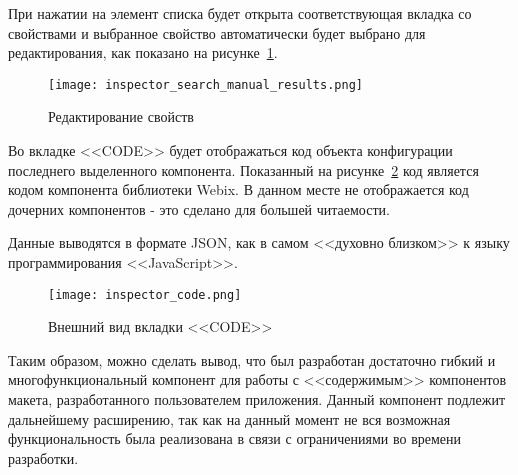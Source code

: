 При нажатии на элемент списка будет открыта соответствующая вкладка со свойствами и выбранное свойство автоматически будет выбрано для редактирования, как показано на рисунке~\ref{sec:manual:inspector_search_manual_results}.\pagebreak

\begin{figure}[ht]
  \centering
    \texttt{[image: inspector\_search\_manual\_results.png]}
    \caption{Редактирование свойств}
    \label{sec:manual:inspector_search_manual_results}
\end{figure}

Во вкладке <<CODE>> будет отображаться код объекта конфигурации последнего выделенного компонента. Показанный на рисунке~\ref{sec:manual:inspector_code} код является кодом компонента библиотеки Webix. В данном месте не отображается код дочерних компонентов - это сделано для большей читаемости.

Данные выводятся в формате JSON, как в самом <<духовно близком>> к языку программирования <<JavaScript>>.

\begin{figure}[ht]
  \centering
    \texttt{[image: inspector\_code.png]}
    \caption{Внешний вид вкладки <<CODE>>}
    \label{sec:manual:inspector_code}
\end{figure}

Таким образом, можно сделать вывод, что был разработан достаточно гибкий и многофункциональный компонент для работы с <<содержимым>> компонентов макета, разработанного пользователем приложения. Данный компонент подлежит дальнейшему расширению, так как на данный момент не вся возможная функциональность была реализована в связи с ограничениями во времени разработки.

